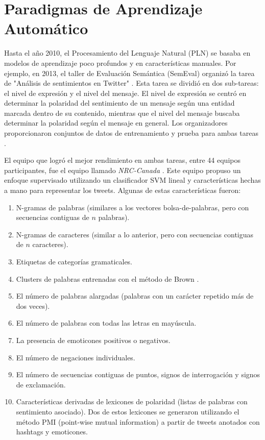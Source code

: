 \section{Paradigmas de Aprendizaje Automático}

Hasta el año 2010, el Procesamiento del Lenguaje Natural (PLN) se basaba en modelos de aprendizaje poco profundos y en características manuales. Por ejemplo, en 2013, el taller de Evaluación Semántica (SemEval) organizó la tarea de "Análisis de sentimientos en Twitter" \cite{Semeval2013}. Esta tarea se dividió en dos sub-tareas: el nivel de expresión y el nivel del mensaje. El nivel de expresión se centró en determinar la polaridad del sentimiento de un mensaje según una entidad marcada dentro de su contenido, mientras que el nivel del mensaje buscaba determinar la polaridad según el mensaje en general. Los organizadores proporcionaron conjuntos de datos de entrenamiento y prueba para ambas tareas \cite{Semeval2013}.

El equipo que logró el mejor rendimiento en ambas tareas, entre 44 equipos participantes, fue el equipo llamado \emph{NRC-Canada} \cite{Mohammad2013}. Este equipo propuso un enfoque supervisado utilizando un clasificador SVM lineal y características hechas a mano para representar los tweets. Algunas de estas características fueron:

\begin{enumerate}
  \item N-gramas de palabras (similares a los vectores bolsa-de-palabras, pero con secuencias contiguas de $n$ palabras).
  \item N-gramas de caracteres (similar a lo anterior, pero con secuencias contiguas de $n$ caracteres).
  \item Etiquetas de categorías gramaticales.
  \item Clusters de palabras entrenadas con el método de Brown \cite{brown1992class}.
  \item El número de palabras alargadas (palabras con un carácter repetido más de dos veces).
  \item El número de palabras con todas las letras en mayúscula.
  \item La presencia de emoticones positivos o negativos.
  \item El número de negaciones individuales.
  \item El número de secuencias contiguas de puntos, signos de interrogación y signos de exclamación.
  \item Características derivadas de lexicones de polaridad \cite{Mohammad2013} (listas de palabras con sentimiento asociado). Dos de estos lexicones se generaron utilizando el método PMI (point-wise mutual information) a partir de tweets anotados con hashtags y emoticones.
\end{enumerate}

